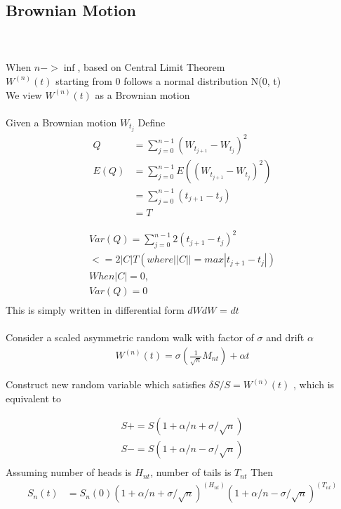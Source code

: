 \documentclass[a4paper]{article}
\begin{document}
\subsection{Brownian Motion}\\
 \\
When $n-> \inf$, based on Central Limit Theorem\\ 
$W^{(n)}(t)$ starting from 0 follows a normal distribution N(0, t)\\
We view $W^{(n)}(t)$ as a Brownian motion\\

 \\
 Given a Brownian motion $W_{t_j}$
 Define 
 \begin{align*}
	Q &= \sum_{j=0} ^{n-1} (W_{t_{j+1}} - W_{t_j})^2 \\
 	E(Q)  &= \sum_{j=0} ^{n-1} E ((W_{t_{j+1}} - W_{t_j})^2) \\
       & = \sum_{j=0} ^{n-1} (t_{j+1} - t_j) \\
       & = T
\end{align*}

 \begin{align*}
   Var(Q) = \sum_{j=0}^{n-1} 2(t_{j+1} - t_{j})^2 \\
   <= 2|C|T (where ||C|| = max|t_{j+1} - t_{j} |) \\
    When |C| = 0, \\
    Var(Q) = 0 \\
 \end{align*}
        This is simply written in differential form $dW dW$ = $dt$\\

\\

Consider a scaled asymmetric random walk with factor of $\sigma$ and drift $\alpha$
  \begin{align*}
	W^{(n)}(t) =  \sigma  (\frac{1}{\sqrt{n}} M_{nt} )+ \alpha t
  \end{align*}
  
  Construct new random variable which satisfies
  $\delta S / S = W^{(n)}(t)$ , which is equivalent to 
	
	\begin{align*}
  S+ = S(1+\alpha /n + \sigma /\sqrt{n}) \\
  S- =  S(1+\alpha /n - \sigma /\sqrt{n}) \\
	\end{align*}
  Assuming number of heads is $H_{nt}$, number of tails is $T_{nt}$
  Then 
  \begin{align*}
	 S_n(t) &= S_n(0) (1+\alpha /n + \sigma /\sqrt{n})^{(H_{nt})} (1+\alpha /n - \sigma /\sqrt{n})^{(T_{nt})} \\
   \end{align*}
 
\end{document}
